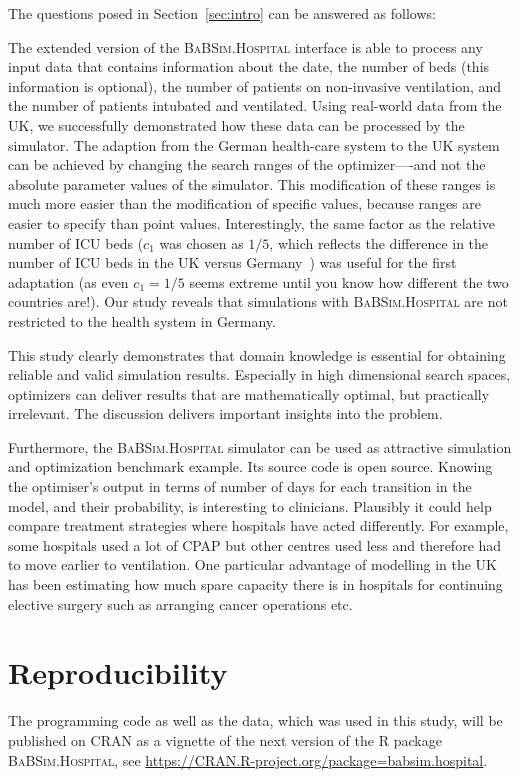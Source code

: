 \documentclass[conference]{IEEEtran}
\newcommand{\babsimhospital}{\textsc{BaBSim.Hospital}\xspace}
\begin{document}
The questions posed in Section~\ref{sec:intro} can be answered as follows:
\begin{compactenum}[(Q-1)]
\item The extended version of the \babsimhospital interface is able to process any input data that contains information about the date, the number of beds (this information is optional), the number of patients on non-invasive ventilation, and the number of patients intubated and ventilated. Using real-world data from the UK, we successfully demonstrated how these data can be processed by the simulator.
The adaption from the German health-care system to the UK system can be achieved by changing the search ranges of the optimizer----and not the absolute parameter values of the simulator. This modification of these ranges is much more easier than the modification of specific values, because ranges are easier to specify than point values. Interestingly, the same factor as the relative number of \gls{ICU} beds ($c_1$ was chosen as $1/5$, which reflects the difference in the number of \gls{ICU} beds in the UK versus Germany~\cite{rhodes_variability_2012}) was useful for the first adaptation (as even $c_1=1/5 $ seems extreme until you know how different the two countries are!).
Our study reveals that simulations with \babsimhospital are not restricted to the health system in Germany.
\item This study clearly demonstrates that domain knowledge is essential for obtaining reliable and valid simulation results. Especially in high dimensional search spaces, optimizers can deliver results that are mathematically optimal, but practically irrelevant. The discussion delivers important insights into the problem. 
\end{compactenum}
Furthermore, the \babsimhospital simulator can be used as attractive simulation and optimization benchmark example. Its source code is open source. 
Knowing the optimiser's output in terms of number of days for each transition in the model, and their probability, is interesting to clinicians. Plausibly it could help compare treatment strategies where hospitals have acted differently. For example, some hospitals used a lot of \gls{CPAP} but other centres used less and therefore had to move earlier to ventilation.
One particular advantage of modelling in the UK has been estimating how much spare capacity there is in hospitals for continuing elective surgery such as arranging cancer operations etc.

\section*{Reproducibility}
The programming code as well as the data, which was used in this study, will be published on CRAN as a vignette of the next version of the R  package \babsimhospital, see \url{https://CRAN.R-project.org/package=babsim.hospital}.  
\end{document}
